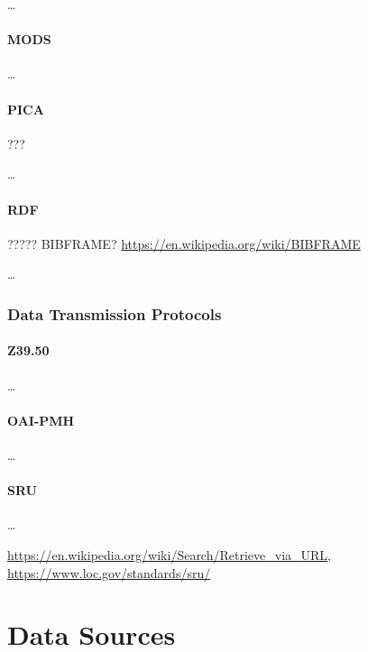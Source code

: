 \dots

\paragraph{MODS}

\dots

\paragraph{PICA} ???

\dots

\paragraph{RDF}  ????? BIBFRAME? \url{https://en.wikipedia.org/wiki/BIBFRAME}

\dots

\subsubsection{Data Transmission Protocols}

\paragraph{Z39.50}

\dots

\paragraph{OAI-PMH}

\dots

\paragraph{SRU}

\dots

\url{https://en.wikipedia.org/wiki/Search/Retrieve_via_URL}, \url{https://www.loc.gov/standards/sru/}



\section{Data Sources}
\label{sec:data_sources}

